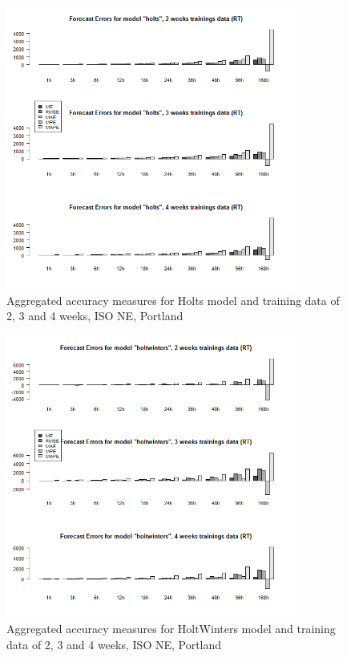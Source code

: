 \begin{figure}[!ht]
	\centering
		\includegraphics[width=0.85\textwidth]{figures/appendix_forecast_results/rt_sim_4_x_1w_1w_holts.png}
	\caption{Aggregated accuracy measures for Holts model and training data of 2, 3 and 4 weeks, ISO NE, Portland}
	\label{fig:app_rt_sim_4_x_1w_1w_holts}
	\vspace*{-1.6in}
\end{figure}




\begin{figure}[!ht]
	\centering
	\vspace*{-1.2in}
		\includegraphics[width=0.85\textwidth]{figures/appendix_forecast_results/rt_sim_4_x_1w_1w_holtwinters.png}
	\caption{Aggregated accuracy measures for HoltWinters model and training data of 2, 3 and 4 weeks, ISO NE, Portland}
	\label{fig:app_rt_sim_4_x_1w_1w_holtwinters}
\end{figure}

